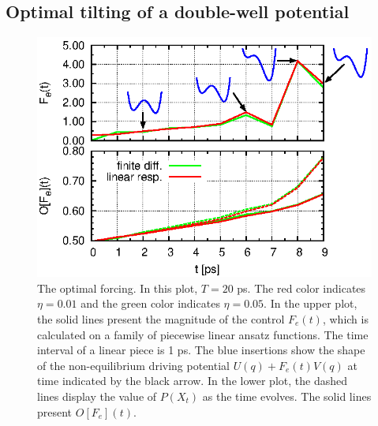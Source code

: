 \documentclass[aip,jcp,a4paper,reprint,onecolumn]{revtex4-1}
\begin{document}
\subsection{Optimal tilting of a double-well potential}
\begin{figure}
  \centering
  \includegraphics[]{figs/fig-ctr-stat-2.eps}
  \caption{The optimal forcing.  In this plot, $T=20$ ps.  The red
    color indicates $\eta = 0.01$ and the green color indicates $\eta
    = 0.05$.  In the upper plot, the solid lines present the magnitude
    of the control $F_e(t)$, which is calculated on a family of
    piecewise linear ansatz functions. The time interval of a linear
    piece is 1 ps.  The blue insertions show the shape of the
    non-equilibrium driving potential $U( q) + F_e(t)V(
    q)$ at time indicated by the black arrow.  In the lower plot, the
    dashed lines display the value of $P( X_t)$ as the time
    evolves.  The solid lines present $O[F_e](t)$.  }\label{fig:tmp7}
\end{figure}
\end{document}
